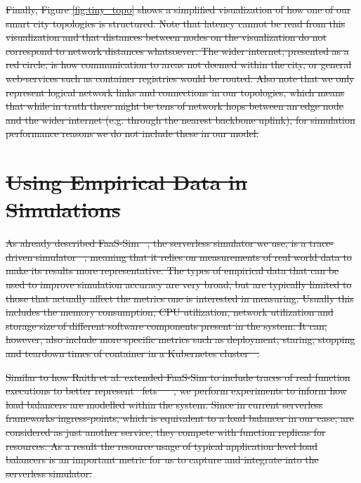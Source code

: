 \documentclass[draft,final]{vutinfth} %
\providecommand{\DIFdeltex}[1]{{\protect\color{red}\sout{#1}}}                      %
\providecommand{\DIFdel}[1]{\texorpdfstring{\DIFdeltex{#1}}{}} %
\begin{document}
\DIFdel{Finally, Figure \ref{fig:tiny_topo} shows a simplified visualization of how one of our smart city topologies is structured.
Note that latency cannot be read from this visualization and that distances between nodes on the visualization do not correspond to network distances whatsoever.
The wider internet, presented as a red circle, is how communication to areas not deemed within the city, or general web-services such as container registries would be routed.
Also note that we only represent logical network links and connections in our topologies, which means that while in truth there might be tens of network hops between an edge node and the wider internet (e.g. through the nearest backbone uplink), for simulation performance reasons we do not include these in our model.
}\section{\DIFdel{Using Empirical Data in Simulations}}
\addtocounter{section}{-1}%
\DIFdel{As already described FaaS-Sim\mbox{%
\cite{faas-sim-github}}\hskip0pt%
, the serverless simulator we use, is a trace-driven simulator\mbox{%
\cite{thomas-thesis}}\hskip0pt%
, meaning that it relies on measurements of real world data to make its results more representative.
The types of empirical data that can be used to improve simulation accuracy are very broad, but are typically limited to those that actually affect the metrics one is interested in measuring.
Usually this includes the memory consumption, CPU utilization, network utilization and storage size of different software components present in the system.
It can, however, also include more specific metrics such as deployment, staring, stopping and teardown times of container in a Kubernetes cluster\mbox{%
\cite{skippy}}\hskip0pt%
.
}%

\DIFdel{Similar to how Raith et al. extended FaaS-Sim to include traces of real function executions to better represent \mbox{%
\glspl{fet} }\hskip0pt%
\mbox{%
\cite{philipp-da}}\hskip0pt%
, we perform experiments to inform how load balancers are modelled within the system.
Since in current serverless frameworks ingress-points, which is equivalent to a load balancer in our case, are considered as just another service, they compete with function replicas for resources.
As a result the resource usage of typical application level load balancers is an important metric for us to capture and integrate into the serverless simulator.
}%
\end{document}
